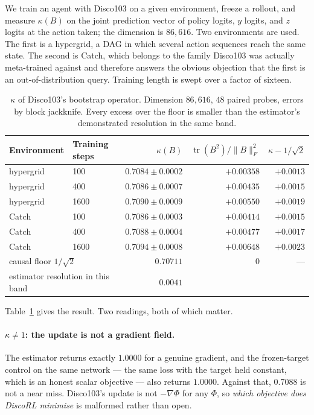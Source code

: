 \documentclass[11pt]{article}
\theoremstyle{remark}
\newcommand{\tr}{\operatorname{tr}}
\begin{document}
We train an agent with Disco103 on a given environment, freeze a rollout, and
measure $\kappa(B)$ on the joint prediction vector of policy logits, $y$ logits,
and $z$ logits at the action taken; the dimension is $86{,}616$. Two
environments are used. The first is a hypergrid, a DAG in which several action
sequences reach the same state. The second is Catch, which belongs to the family
Disco103 was actually meta-trained against and therefore answers the obvious
objection that the first is an out-of-distribution query. Training length is
swept over a factor of sixteen.

\begin{table}[t]
\centering
\begin{tabular}{llrrr}
\toprule
Environment & Training steps & $\kappa(B)$ & $\tr(B^2)/\lVert B\rVert_F^2$ & $\kappa - 1/\sqrt2$ \\
\midrule
hypergrid & 100  & $0.7084 \pm 0.0002$ & $+0.00358$ & $+0.0013$ \\
hypergrid & 400  & $0.7086 \pm 0.0007$ & $+0.00435$ & $+0.0015$ \\
hypergrid & 1600 & $0.7090 \pm 0.0009$ & $+0.00550$ & $+0.0019$ \\
Catch     & 100  & $0.7086 \pm 0.0003$ & $+0.00414$ & $+0.0015$ \\
Catch     & 400  & $0.7088 \pm 0.0004$ & $+0.00477$ & $+0.0017$ \\
Catch     & 1600 & $0.7094 \pm 0.0008$ & $+0.00648$ & $+0.0023$ \\
\midrule
\multicolumn{2}{l}{causal floor $1/\sqrt2$} & $0.70711$ & $0$ & --- \\
\multicolumn{2}{l}{estimator resolution in this band} & $0.0041$ & & \\
\bottomrule
\end{tabular}
\caption{$\kappa$ of Disco103's bootstrap operator. Dimension $86{,}616$, $48$
paired probes, errors by block jackknife. Every excess over the floor is smaller
than the estimator's demonstrated resolution in the same band.}
\label{tab:kappa}
\end{table}

Table~\ref{tab:kappa} gives the result. Two readings, both of which matter.

\paragraph{$\kappa \neq 1$: the update is not a gradient field.} The estimator
returns exactly $1.0000$ for a genuine gradient, and the frozen-target control on
the same network --- the same loss with the target held constant, which is an
honest scalar objective --- also returns $1.0000$. Against that, $0.7088$ is not
a near miss. Disco103's update is not $-\nabla\Phi$ for any $\Phi$, so
\emph{which objective does DiscoRL minimise} is malformed rather than open.
\end{document}

